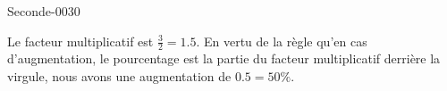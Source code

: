 
\begin{corrige}{Seconde-0030}

    Le facteur multiplicatif est \( \frac{ 3 }{ 2 }=1.5\). En vertu de la règle qu'en cas d'augmentation, le pourcentage est la partie du facteur multiplicatif derrière la virgule, nous avons une augmentation de \( 0.5=50\%\).

\end{corrige}
